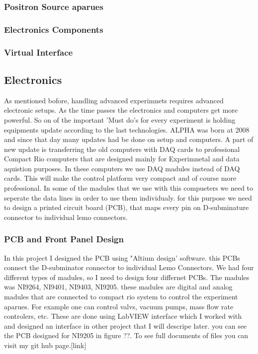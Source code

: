 \documentclass{article}
\begin{document}
\subsubsection{Positron Source aparues}


\subsubsection{Electronics Components}

\subsubsection{Virtual Interface}


\subsection{Electronics}
As mentioned bofore, handling advanced experimnets requires advanced electronic setups. As the  time passes the electronics and computers get more powerful. So on of the important 'Must do's for every experiment is holding equipments update according to the last technologies. ALPHA was born at 2008 and since that day many updates had be done on setup and computers. A part of new update is transferring the old computers with DAQ cards to professional Compact Rio computers that are designed mainly for Experimnetal and data aquistion purposes. In these computers we use DAQ madules instead of DAQ cards. This will make the control platform very compact and of course more professional. In some of the madules that we use with this compueters we need to seperate the data lines in order to use them individualy. for this purpose we need to design a printed circuit board (PCB), that maps every pin on D-subminature connector to individual lemo connectors.
\subsubsection{PCB and Front Panel Design}
In this project I designed the PCB using "Altium design' software. this PCBs connect the D-subminator connector to individual Lemo Connectors. We had four different types of madules, so I need to design four differnet PCBs.
The madules was NI9264, NI9401, NI9403, NI9205. these madules are digital and analog madules that are connected to compact rio system to control the experiment aparues. For example one can control valvs, vacuum pumps, mass flow rate controlers, etc. These are done using LabVIEW interface which I worked with and designed an interface in other project that  I will descripe later. you can see the PCB designed for NI9205 in figure ??. To see full documents of files you can visit my git hub page.[link]
\end{document}
